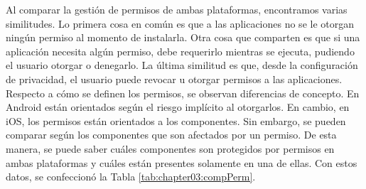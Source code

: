 Al comparar la gestión de permisos de ambas plataformas, encontramos varias similitudes. Lo primera cosa en común es que a las aplicaciones no se le otorgan ningún permiso al momento de instalarla. Otra cosa que comparten es que si una aplicación necesita algún permiso, debe requerirlo mientras se ejecuta, pudiendo el usuario otorgar o denegarlo. La última similitud es que, desde la configuración de privacidad, el usuario puede revocar u otorgar permisos a las aplicaciones.\\

Respecto a cómo se definen los permisos, se observan diferencias de concepto. En Android están orientados según el riesgo implícito al otorgarlos. En cambio, en iOS, los permisos están orientados a los componentes. Sin embargo, se pueden comparar según los componentes que son afectados por un permiso. De esta manera, se puede saber cuáles componentes son protegidos por permisos en ambas plataformas y cuáles están presentes solamente en una de ellas. Con estos datos, se confeccionó la Tabla \ref{tab:chapter03:compPerm}.\\

